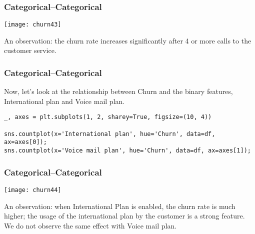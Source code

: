 \begin{frame}[fragile]\frametitle{Categorical–Categorical}
\begin{center}
\texttt{[image: churn43]}
\end{center}
An observation: the churn rate increases significantly after 4 or more calls to the customer service.
\end{frame}



\begin{frame}[fragile]\frametitle{Categorical–Categorical}
Now, let's look at the relationship between Churn and the binary features, International plan and Voice mail plan.
 \begin{lstlisting}
_, axes = plt.subplots(1, 2, sharey=True, figsize=(10, 4))

sns.countplot(x='International plan', hue='Churn', data=df, ax=axes[0]);
sns.countplot(x='Voice mail plan', hue='Churn', data=df, ax=axes[1]);
\end{lstlisting}
\end{frame}

\begin{frame}[fragile]\frametitle{Categorical–Categorical}
\begin{center}
\texttt{[image: churn44]}
\end{center}
An observation: when International Plan is enabled, the churn rate is much higher; the usage of the international plan by the customer is a strong feature. We do not observe the same effect with Voice mail plan.
\end{frame}